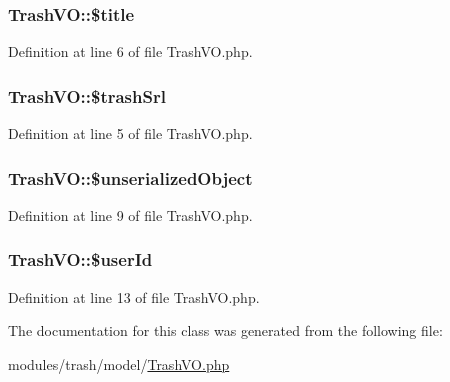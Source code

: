\hypertarget{classTrashVO_ac6f85be76ea94f3fde44e0527bdcadc1}{
\subsubsection[{\$title}]{\setlength{\rightskip}{0pt plus 5cm}Trash\-V\-O\-::\$title}}\label{classTrashVO_ac6f85be76ea94f3fde44e0527bdcadc1}


Definition at line 6 of file Trash\-V\-O.\-php.

\hypertarget{classTrashVO_a8aeea2d547b7a335d987bcf4369a969c}{
\subsubsection[{\$trash\-Srl}]{\setlength{\rightskip}{0pt plus 5cm}Trash\-V\-O\-::\$trash\-Srl}}\label{classTrashVO_a8aeea2d547b7a335d987bcf4369a969c}


Definition at line 5 of file Trash\-V\-O.\-php.

\hypertarget{classTrashVO_a43048c60bc9505999742be271b5d9385}{
\subsubsection[{\$unserialized\-Object}]{\setlength{\rightskip}{0pt plus 5cm}Trash\-V\-O\-::\$unserialized\-Object}}\label{classTrashVO_a43048c60bc9505999742be271b5d9385}


Definition at line 9 of file Trash\-V\-O.\-php.

\hypertarget{classTrashVO_a346f371317bde03b5a209e00cb33a603}{
\subsubsection[{\$user\-Id}]{\setlength{\rightskip}{0pt plus 5cm}Trash\-V\-O\-::\$user\-Id}}\label{classTrashVO_a346f371317bde03b5a209e00cb33a603}


Definition at line 13 of file Trash\-V\-O.\-php.



The documentation for this class was generated from the following file\-:\begin{DoxyCompactItemize}
\item 
modules/trash/model/\hyperlink{TrashVO_8php}{Trash\-V\-O.\-php}\end{DoxyCompactItemize}
